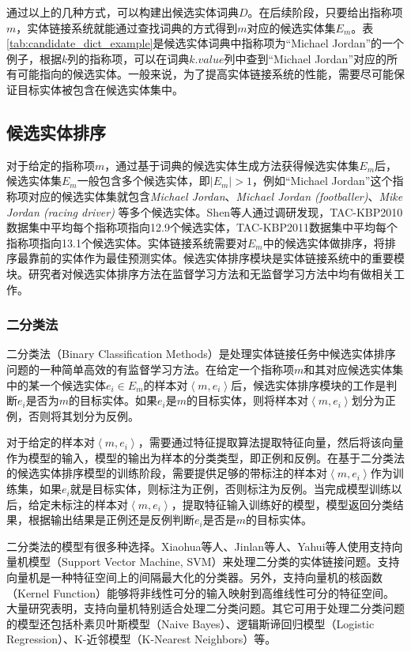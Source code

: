 通过以上的几种方式，可以构建出候选实体词典$D$。在后续阶段，只要给出指称项$m$，实体链接系统就能通过查找词典的方式得到$m$对应的候选实体集$E_m$。表\ref{tab:candidate_dict_example}是候选实体词典中指称项为“Michael Jordan”的一个例子，根据$k$列的指称项，可以在词典$k.value$列中查到“Michael Jordan”对应的所有可能指向的候选实体。一般来说，为了提高实体链接系统的性能，需要尽可能保证目标实体被包含在候选实体集中。

\subsection{候选实体排序}\label{section:candidate_rank}
对于给定的指称项$m$，通过基于词典的候选实体生成方法获得候选实体集$E_m$后，候选实体集$E_m$一般包含多个候选实体，即$|E_m|>1$，例如“Michael Jordan”这个指称项对应的候选实体集就包含\textit{Michael Jordan}、\textit{Michael Jordan (footballer)}、\textit{Mike Jordan (racing driver) }等多个候选实体。Shen等人\cite{ELKBITS}通过调研发现，TAC-KBP2010数据集中平均每个指称项指向12.9个候选实体，TAC-KBP2011数据集中平均每个指称项指向13.1个候选实体。实体链接系统需要对$E_m$中的候选实体做排序，将排序最靠前的实体作为最佳预测实体。候选实体排序模块是实体链接系统中的重要模块。研究者对候选实体排序方法在监督学习方法和无监督学习方法中均有做相关工作。

\setcounter{secnumdepth}{3}
\subsubsection{二分类法}
二分类法（Binary Classification Methods）是处理实体链接任务中候选实体排序问题的一种简单高效的有监督学习方法。在给定一个指称项$m$和其对应候选实体集中的某一个候选实体$e_i\in E_m$的样本对$\left\langle m,e_i\right\rangle $后，候选实体排序模块的工作是判断$e_i$是否为$m$的目标实体。如果$e_i$是$m$的目标实体，则将样本对$\left\langle m,e_i\right\rangle $划分为正例，否则将其划分为反例。

对于给定的样本对$\left\langle m,e_i\right\rangle $，需要通过特征提取算法提取特征向量，然后将该向量作为模型的输入，模型的输出为样本的分类类型，即正例和反例。在基于二分类法的候选实体排序模型的训练阶段，需要提供足够的带标注的样本对$\left\langle m,e_i\right\rangle $作为训练集，如果$e_i$就是目标实体，则标注为正例，否则标注为反例。当完成模型训练以后，给定未标注的样本对$\left\langle m,e_i\right\rangle $，提取特征输入训练好的模型，模型返回分类结果，根据输出结果是正例还是反例判断$e_i$是否是$m$的目标实体。

二分类法的模型有很多种选择。Xiaohua等人\cite{ELFT}、Jinlan等人\cite{ELNDUSCM}、Yahui等人\cite{FNEDLSBKB}使用支持向量机模型（Support Vector Machine, SVM）来处理二分类的实体链接问题。支持向量机是一种特征空间上的间隔最大化的分类器。另外，支持向量机的核函数（Kernel Function）能够将非线性可分的输入映射到高维线性可分的特征空间。大量研究表明，支持向量机特别适合处理二分类问题。其它可用于处理二分类问题的模型还包括朴素贝叶斯模型（Naive Bayes）、逻辑斯谛回归模型（Logistic Regression）、K-近邻模型（K-Nearest Neighbors）等。

